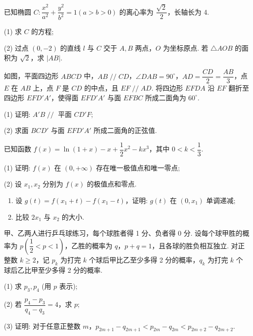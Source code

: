 \documentclass{exam-zh}
\begin{document}
\begin{problem}[points = 15]
已知椭圆 $C: \dfrac{x^2}{a^2} + \dfrac{y^2}{b^2} = 1 (a>b>0)$ 的离心率为 $\dfrac{\sqrt{2}}{2}$，长轴长为 4.

(1) 求 $C$ 的方程;

(2) 过点 $(0,-2)$ 的直线 $l$ 与 $C$ 交于 $A,B$ 两点，$O$ 为坐标原点. 若 $\triangle AOB$ 的面积为 $\sqrt{2}$，求 $|AB|$.
\end{problem}


\begin{problem}[points = 15]
如图，平面四边形 $ABCD$ 中，$AB \mathop{//} CD$，$\angle DAB = 90^\circ$，$AD=\dfrac{CD}{2}=\dfrac{AB}{3}$，点 $E$ 在 $AB$ 上，点 $F$ 是 $CD$ 的中点，且 $EF \mathop{//} AD$. 将四边形 $EFDA$ 沿 $EF$ 翻折至四边形 $EFD'A'$，使得面 $EFD'A'$ 与面 $EFBC$ 所成二面角为 $60^\circ$.

(1) 证明: $A'B \mathop{//}$ 平面 $CD'F$;

(2) 求面 $BCD'$ 与面 $EFD'A'$ 所成二面角的正弦值.
\end{problem}


\begin{problem}[points = 17]
已知函数 $f(x)=\ln(1+x)-x+\dfrac{1}{2}x^2-kx^3$，其中 $0 < k < \dfrac{1}{3}$.

(1) 证明: $f(x)$ 在 $(0,+\infty)$ 存在唯一极值点和唯一零点;

(2) 设 $x_1, x_2$ 分别为 $f(x)$ 的极值点和零点.
\begin{enumerate}
\item 设 $g(t)=f(x_1+t)-f(x_1-t)$，证明: $g(t)$ 在 $(0, x_1)$ 单调递减;
\item 比较 $2x_1$ 与 $x_2$ 的大小.
\end{enumerate}
\end{problem}


\begin{problem}[points = 17]
甲、乙两人进行乒乓球练习，每个球胜者得 1 分、负者得 0 分. 设每个球甲胜的概率为 $p \left(\dfrac{1}{2}<p<1\right)$，乙胜的概率为 $q$，$p+q=1$，且各球的胜负相互独立. 对正整数 $k \geqslant 2$，记 $p_k$ 为打完 $k$ 个球后甲比乙至少多得 2 分的概率，$q_k$ 为打完 $k$ 个球后乙比甲至少多得 2 分的概率.

(1) 求 $p_3, p_4$ (用 $p$ 表示);

(2) 若 $\dfrac{p_4-p_3}{q_4-q_3}=4$，求 $p$;

(3) 证明: 对于任意正整数 $m$，$p_{2m+1}-q_{2m+1} < p_{2m}-q_{2m} < p_{2m+2}-q_{2m+2}$.
\end{problem}
\end{document}
